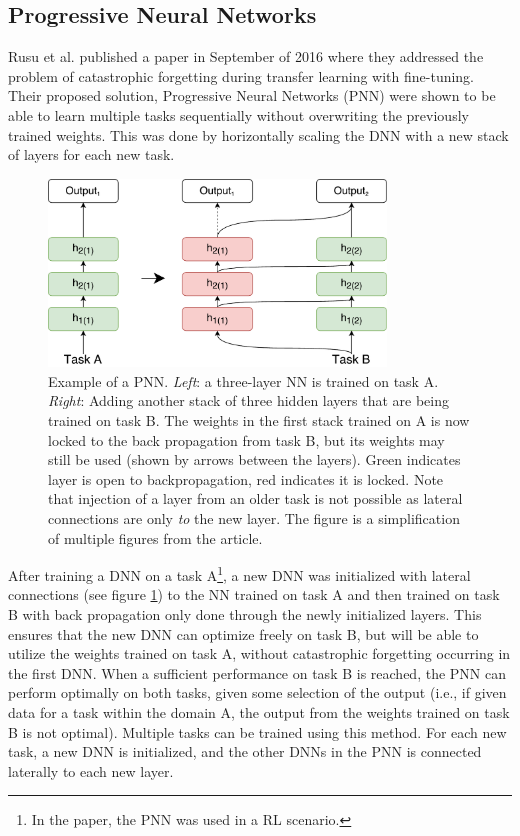 \subsection{Progressive Neural Networks}
Rusu et al. published a paper in September of 2016\cite{progressiveneuralnetworks} where they addressed the problem of catastrophic forgetting during transfer learning with fine-tuning. Their proposed solution, Progressive Neural Networks (PNN) were shown to be able to learn multiple tasks sequentially without overwriting the previously trained weights. This was done by horizontally scaling the DNN with a new stack of layers for each new task.
\begin{figure}[ht]
    \centering
    \includegraphics[width=0.8\textwidth]{Chapters/2.Background/figures/ProgressiveNeuralNet.pdf}
    \caption[Progressive Neural Network]{Example of a PNN. \textit{Left}: a three-layer NN is trained on task A. \textit{Right}: Adding another stack of three hidden layers that are being trained on task B. The weights in the first stack trained on A is now locked to the back propagation from task B, but its weights may still be used (shown by arrows between the layers). Green indicates layer is open to backpropagation, red indicates it is locked. Note that injection of a layer from an older task is not possible as lateral connections are only \textit{to} the new layer. The figure is a simplification of multiple figures from the article\cite{progressiveneuralnetworks}.}
    \label{fig:pnn}
\end{figure}
After training a DNN on a task A\footnote{In the paper, the PNN was used in a RL scenario.}, a new DNN was initialized with lateral connections (see figure \ref{fig:pnn}) to the NN trained on task A and then trained on task B with back propagation only done through the newly initialized layers. This ensures that the new DNN can optimize freely on task B, but will be able to utilize the weights trained on task A, without catastrophic forgetting occurring in the first DNN. When a sufficient performance on task B is reached, the PNN can perform optimally on both tasks, given some selection of the output (i.e., if given data for a task within the domain A, the output from the weights trained on task B is not optimal). Multiple tasks can be trained using this method. For each new task, a new DNN is initialized, and the other DNNs in the PNN is connected laterally to each new layer. 

